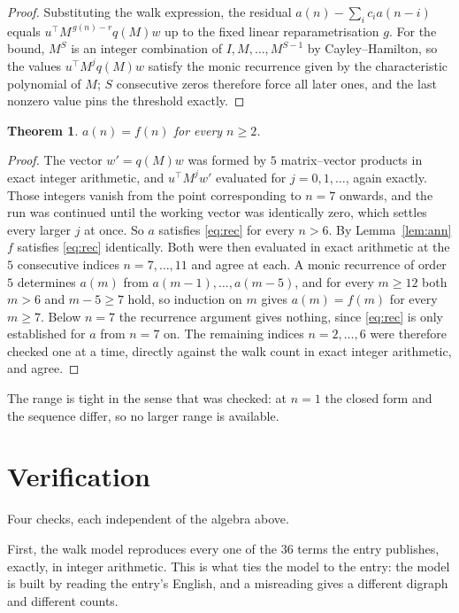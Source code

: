 \documentclass[11pt,a4paper]{article}
\theoremstyle{plain}
\newtheorem{theorem}{Theorem}
\theoremstyle{definition}
\begin{document}
\begin{proof}
Substituting the walk expression, the residual $a(n)-\sum_ic_ia(n-i)$ equals
$u^{\!\top}M^{\,g(n)-r}q(M)w$ up to the fixed linear reparametrisation $g$. For the bound,
$M^{S}$ is an integer combination of $I,M,\dots,M^{S-1}$ by Cayley--Hamilton, so the values
$u^{\!\top}M^{j}q(M)w$ satisfy the monic recurrence given by the characteristic polynomial of
$M$; $S$ consecutive zeros therefore force all later ones, and the last nonzero value pins the
threshold exactly.
\end{proof}

\begin{theorem}
$a(n)=f(n)$ for every $n\ge2$.
\end{theorem}

\begin{proof}
The vector $w'=q(M)w$ was formed by $5$ matrix--vector products in exact integer
arithmetic, and $u^{\!\top}M^{j}w'$ evaluated for $j=0,1,\dots$, again exactly. Those integers
vanish from the point corresponding to $n=7$ onwards, and the run was continued until the
working vector was identically zero, which settles every larger $j$ at once. So $a$ satisfies
\eqref{eq:rec} for every $n>6$. By Lemma~\ref{lem:ann} $f$ satisfies \eqref{eq:rec}
identically. Both were then evaluated in exact arithmetic at the $5$ consecutive indices
$n=7,\dots,11$ and agree at each. A monic recurrence of order $5$
determines $a(m)$ from $a(m-1),\dots,a(m-5)$, and for every $m\ge12$ both
$m>6$ and $m-5\ge7$ hold, so induction on $m$ gives $a(m)=f(m)$ for every
$m\ge7$.
Below $n=7$ the recurrence argument gives nothing, since \eqref{eq:rec} is only
established for $a$ from $n=7$ on. The remaining indices $n=2,\dots,6$ were
therefore checked one at a time, directly against the walk count in exact integer arithmetic,
and agree.
\end{proof}

The range is tight in the sense that was checked: at $n=1$ the closed form and the sequence differ, so no larger range is available.

\section{Verification}

Four checks, each independent of the algebra above.

First, the walk model reproduces every one of the $36$ terms the entry publishes,
exactly, in integer arithmetic. This is what ties the model to the entry: the model is built
by reading the entry's English, and a misreading gives a different digraph and different
counts.
\end{document}
